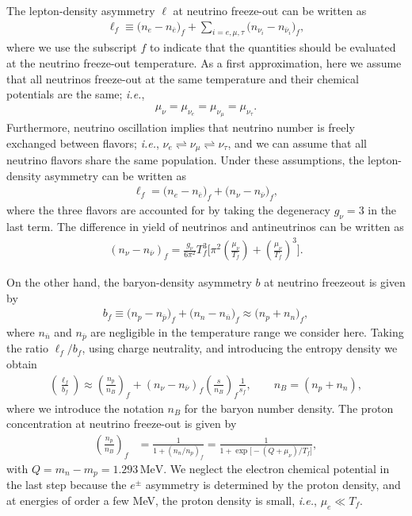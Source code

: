 The lepton-density asymmetry $\ell $ at neutrino freeze-out can be written as
\begin{align}
\ell_f \equiv\big(n_e-n_{\overline{e}}\big)_f+\sum_{i=e,\mu, \tau}\big(n_{\nu_i}-n_{\overline{\nu}_i}\big)_f,
\end{align}
where we use the subscript $f$ to indicate that the quantities should be evaluated at the neutrino freeze-out temperature. As a first approximation, here we assume that all neutrinos freeze-out at the same temperature and their chemical potentials are the same; {\it i.e.\/},
\begin{align}
\mu_\nu=\mu_{\nu_e}=\mu_{\nu_\mu}=\mu_{\nu_\tau}.
\end{align}
Furthermore, neutrino oscillation implies that neutrino number is freely exchanged between flavors; {\it i.e.\/}, $\nu_e\rightleftharpoons\nu_\mu\rightleftharpoons\nu_\tau$, and we can assume that all neutrino flavors share the same population. Under these assumptions, the lepton-density asymmetry can be written as
\begin{align}
\label{L_asymmetry} 
\ell_f=\big(n_e-n_{\overline{e}}\big)_f+\big(n_{\nu}-n_{\overline{\nu}}\big)_f,
\end{align}
where the three flavors are accounted for by taking the degeneracy $g_\nu=3$ in the last term. The difference in yield of neutrinos and antineutrinos can be written as
\begin{align}
\label{Excess_Neutrino}
\left(n_\nu-n_{\overline{\nu}}\right)_f=\frac{g_\nu}{6\pi^2}T^3_f\bigg[\pi^2\left(\frac{\mu_\nu}{T_f}\right)+\left(\frac{\mu_\nu}{T_f}\right)^{\!\!3}\bigg].
\end{align}


On the other hand, the baryon-density asymmetry $b$ at neutrino freezeout is given by
\begin{align}
\label{B_asymmetry}
b_f \equiv\big(n_p-n_{\overline{p}}\big)_f+\big(n_n-n_{\overline{n}}\big)_f \approx \big(n_p+n_n\big)_f,
\end{align}
where $n_{\overline{n}}$ and $n_{\overline{p}}$ are negligible in the temperature range we consider here. Taking the ratio $\ell_f/b_f$, using charge neutrality, and introducing the entropy density we obtain
\begin{align}\label{Lf_Bf}
\left(\frac{\ell_f}{b_f}\right)  
\approx\left(\frac{n_p}{n_B} \right)_f+\left(n_{\nu}-n_{\overline{\nu}}\right)_f \left(\frac{s}{n_B}\right)_f \frac{1}{s_f},\qquad n_B=(n_p+n_n),
\end{align}
where we introduce the notation $n_B$ for the baryon number density. The proton concentration at neutrino freeze-out is given by
\begin{align}
\label{X_proton}
\left(\frac{n_p}{n_B}\right)_f&=\frac{1}{1+(n_n/n_p)_f}=\frac{1}{1+\exp{\big[-\left(Q+\mu_\nu\right)/T_f\big]}},
\end{align}
with $Q=m_n-m_p=1.293\,\mathrm{MeV}$. We neglect the electron chemical potential in the last step because the $e^\pm$ asymmetry is determined by the proton density, and at energies of order a few MeV, the proton density is small, {\it i.e.\/}, $\mu_e\ll T_f$. 

